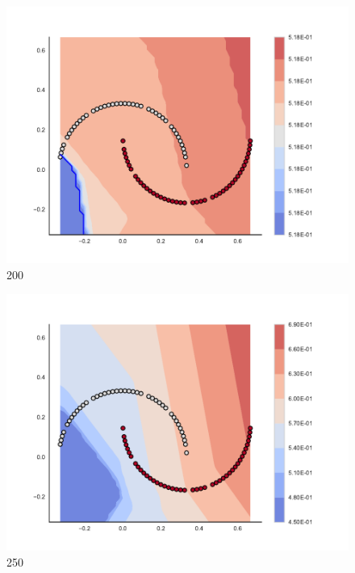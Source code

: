 \begin{subfigure}[b]{0.09\textwidth}
    \includegraphics[width=\textwidth]{img/convergence/200.pdf}
    \caption{200}
    \label{fig:convergence_200}
\end{subfigure}
%
\begin{subfigure}[b]{0.09\textwidth}
    \includegraphics[width=\textwidth]{img/convergence/250.pdf}
    \caption{250}
    \label{fig:convergence_250}
\end{subfigure}
%
